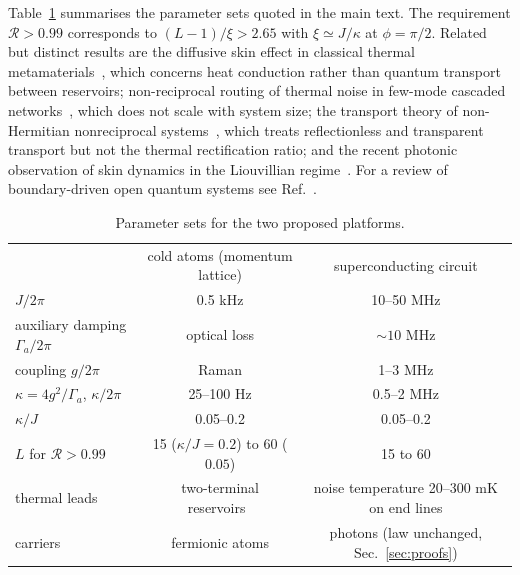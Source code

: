 \documentclass[aps,prl,superscriptaddress,nofootinbib,onecolumn,notitlepage,11pt]{revtex4-2}
\newcommand{\R}{\mathcal{R}}
\begin{document}
Table~\ref{tab:exp} summarises the parameter sets quoted in the main text. The requirement $\R>0.99$ corresponds to $(L-1)/\xi>2.65$ with $\xi\simeq J/\kappa$ at $\phi=\pi/2$. Related but distinct results are the diffusive skin effect in classical thermal metamaterials~\cite{Cao2021}, which concerns heat conduction rather than quantum transport between reservoirs; non-reciprocal routing of thermal noise in few-mode cascaded networks~\cite{Xuereb2018}, which does not scale with system size; the transport theory of non-Hermitian nonreciprocal systems~\cite{Ghaemi2021}, which treats reflectionless and transparent transport but not the thermal rectification ratio; and the recent photonic observation of skin dynamics in the Liouvillian regime~\cite{Yang2026}. For a review of boundary-driven open quantum systems see Ref.~\cite{Landi2022}.

\begin{table}[h]
\caption{Parameter sets for the two proposed platforms.}
\label{tab:exp}
\begin{ruledtabular}
\begin{tabular}{lcc}
 & cold atoms (momentum lattice) & superconducting circuit \\
\colrule
$J/2\pi$ & 0.5 kHz & 10--50 MHz \\
auxiliary damping $\Gamma_a/2\pi$ & optical loss & $\sim10$ MHz \\
coupling $g/2\pi$ & Raman & 1--3 MHz \\
$\kappa=4g^2/\Gamma_a$, $\kappa/2\pi$ & 25--100 Hz & 0.5--2 MHz \\
$\kappa/J$ & 0.05--0.2 & 0.05--0.2 \\
$L$ for $\R>0.99$ & 15 ($\kappa/J=0.2$) to 60 ($0.05$) & 15 to 60 \\
thermal leads & two-terminal reservoirs~\cite{Brantut2012,Krinner2017} & noise temperature 20--300 mK on end lines \\
carriers & fermionic atoms & photons (law unchanged, Sec.~\ref{sec:proofs}) \\
\end{tabular}
\end{ruledtabular}
\end{table}



\end{document}
